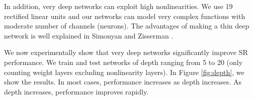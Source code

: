 \documentclass[10pt,twocolumn,letterpaper]{article}
\begin{document}
In addition, very deep networks can exploit high nonlinearities. We use 19 rectified linear units and our networks can model very complex functions with moderate number of channels (neurons). The advantages of making a thin deep network is well explained in Simonyan and Zisserman \cite{simonyan2015very}.

We now experimentally show that very deep networks significantly improve SR performance. We train and test networks of depth ranging from 5 to 20 (only counting weight layers excluding nonlinearity layers). In Figure \ref{fig:depth}, we show the results. In most cases, performance increases as depth increases. As depth increases, performance improves rapidly. 
%
\end{document}
